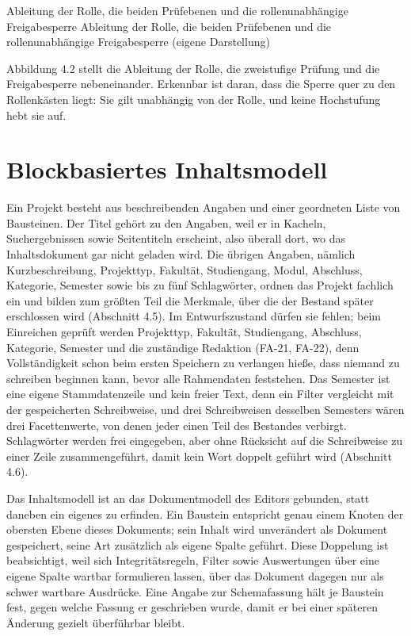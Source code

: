 %
{Ableitung der Rolle, die beiden Prüfebenen und die rollenunabhängige Freigabesperre}%
{Ableitung der Rolle, die beiden Prüfebenen und die rollenunabhängige Freigabesperre (eigene Darstellung)}

Abbildung 4.2 stellt die Ableitung der Rolle, die zweistufige Prüfung und die Freigabesperre nebeneinander. Erkennbar ist daran, dass die Sperre quer zu den Rollenkästen liegt: Sie gilt unabhängig von der Rolle, und keine Hochstufung hebt sie auf.

\section{Blockbasiertes Inhaltsmodell}
\label{sec:inhaltsmodell}

Ein Projekt besteht aus beschreibenden Angaben und einer geordneten Liste von Bausteinen. Der Titel gehört zu den Angaben, weil er in Kacheln, Suchergebnissen sowie Seitentiteln erscheint, also überall dort, wo das Inhaltsdokument gar nicht geladen wird. Die übrigen Angaben, nämlich Kurzbeschreibung, Projekttyp, Fakultät, Studiengang, Modul, Abschluss, Kategorie, Semester sowie bis zu fünf Schlagwörter, ordnen das Projekt fachlich ein und bilden zum größten Teil die Merkmale, über die der Bestand später erschlossen wird (Abschnitt 4.5). Im Entwurfszustand dürfen sie fehlen; beim Einreichen geprüft werden Projekttyp, Fakultät, Studiengang, Abschluss, Kategorie, Semester und die zuständige Redaktion (FA-21, FA-22), denn Vollständigkeit schon beim ersten Speichern zu verlangen hieße, dass niemand zu schreiben beginnen kann, bevor alle Rahmendaten feststehen. Das Semester ist eine eigene Stammdatenzeile und kein freier Text, denn ein Filter vergleicht mit der gespeicherten Schreibweise, und drei Schreibweisen desselben Semesters wären drei Facettenwerte, von denen jeder einen Teil des Bestandes verbirgt. Schlagwörter werden frei eingegeben, aber ohne Rücksicht auf die Schreibweise zu einer Zeile zusammengeführt, damit kein Wort doppelt geführt wird (Abschnitt 4.6).

Das Inhaltsmodell ist an das Dokumentmodell des Editors gebunden, statt daneben ein eigenes zu erfinden. Ein Baustein entspricht genau einem Knoten der obersten Ebene dieses Dokuments; sein Inhalt wird unverändert als Dokument gespeichert, seine Art zusätzlich als eigene Spalte geführt. Diese Doppelung ist beabsichtigt, weil sich Integritätsregeln, Filter sowie Auswertungen über eine eigene Spalte wartbar formulieren lassen, über das Dokument dagegen nur als schwer wartbare Ausdrücke. Eine Angabe zur Schemafassung hält je Baustein fest, gegen welche Fassung er geschrieben wurde, damit er bei einer späteren Änderung gezielt überführbar bleibt.

